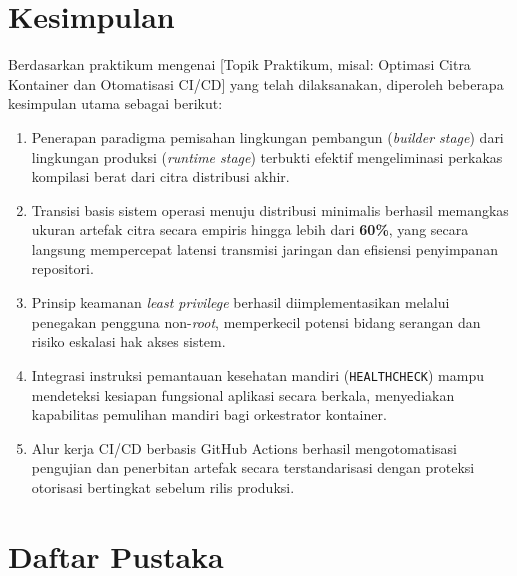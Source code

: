 \chapter{Kesimpulan}
\label{chap:kesimpulan}

Berdasarkan praktikum mengenai [Topik Praktikum, misal: Optimasi Citra Kontainer dan Otomatisasi CI/CD] yang telah dilaksanakan, diperoleh beberapa kesimpulan utama sebagai berikut:

\begin{enumerate}
    \item Penerapan paradigma pemisahan lingkungan pembangun (\textit{builder stage}) dari lingkungan produksi (\textit{runtime stage}) terbukti efektif mengeliminasi perkakas kompilasi berat dari citra distribusi akhir.
    
    \item Transisi basis sistem operasi menuju distribusi minimalis berhasil memangkas ukuran artefak citra secara empiris hingga lebih dari \textbf{60\%}, yang secara langsung mempercepat latensi transmisi jaringan dan efisiensi penyimpanan repositori.
    
    \item Prinsip keamanan \textit{least privilege} berhasil diimplementasikan melalui penegakan pengguna non-\textit{root}, memperkecil potensi bidang serangan dan risiko eskalasi hak akses sistem.
    
    \item Integrasi instruksi pemantauan kesehatan mandiri (\texttt{HEALTHCHECK}) mampu mendeteksi kesiapan fungsional aplikasi secara berkala, menyediakan kapabilitas pemulihan mandiri bagi orkestrator kontainer.
    
    \item Alur kerja CI/CD berbasis GitHub Actions berhasil mengotomatisasi pengujian dan penerbitan artefak secara terstandarisasi dengan proteksi otorisasi bertingkat sebelum rilis produksi.
\end{enumerate}

\chapter{Daftar Pustaka}
\label{chap:daftarpustaka}

